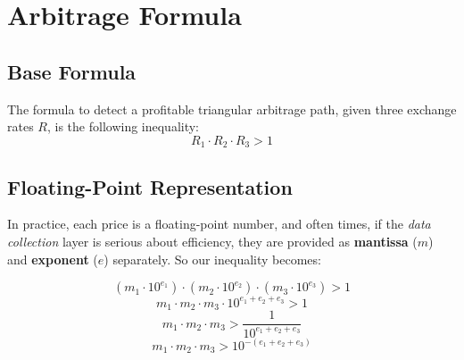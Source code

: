\documentclass[11pt]{article}
\begin{document}
\begin{center}
\end{center}

\section{Arbitrage Formula}

\subsection{Base Formula}
The formula to detect a profitable triangular arbitrage path, given three exchange rates \(R\), is the following inequality:
\begin{equation}
    R_{1} \cdot R_{2} \cdot R_{3} > 1
\end{equation}

\subsection{Floating-Point Representation}
In practice, each price is a floating-point number, and often times, if the \textit{data collection} layer is serious about efficiency, they are provided as \textbf{mantissa} (\(m\)) and \textbf{exponent} (\(e\)) separately. So our inequality becomes:

\begin{equation}
    \left( m_1 \cdot 10^{e_1} \right) \cdot \left( m_2 \cdot 10^{e_2} \right) \cdot \left( m_3 \cdot 10^{e_3} \right) > 1
\end{equation}
\begin{equation}
    m_1 \cdot m_2 \cdot m_3 \cdot 10^{e_1 + e_2 + e_3} > 1
\end{equation}
\begin{equation}
    m_1 \cdot m_2 \cdot m_3 > \frac{1}{10^{e_1 + e_2 + e_3}}
\end{equation}
\begin{equation}
    m_1 \cdot m_2 \cdot m_3 > 10^{-(e_1 + e_2 + e_3)}
\end{equation}
\end{document}
